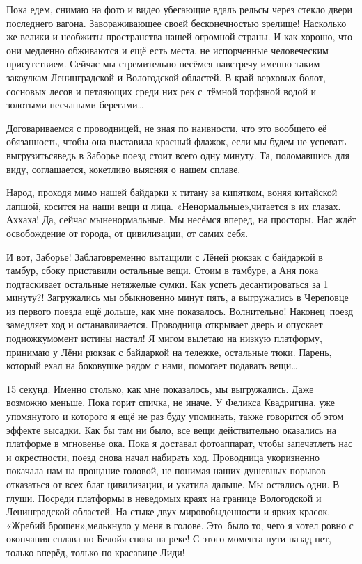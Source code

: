 Пока едем, снимаю на фото и видео убегающие вдаль рельсы через стекло двери последнего вагона. Завораживающее своей бесконечностью зрелище! Насколько же велики и необжиты пространства нашей огромной страны. И как хорошо, что они медленно обживаются и ещё есть места, не испорченные человеческим присутствием. Сейчас мы стремительно несёмся навстречу именно таким закоулкам Ленинградской и Вологодской областей. В край верховых болот, сосновых лесов и петляющих среди них рек с~тёмной торфяной водой и золотыми песчаными берегами\ldots~

Договариваемся с проводницей, не зная по наивности, что это вообще\sdash то её обязанность, чтобы она выставила красный флажок, если мы будем не успевать выгрузиться\mdash ведь в Заборье поезд стоит всего одну минуту. Та, поломавшись для виду, соглашается, кокетливо выясняя о нашем сплаве. 

Народ, проходя мимо нашей байдарки к титану за кипятком, воняя китайской лапшой, косится на наши вещи и лица.  «Ненормальные»,\mdash читается в их глазах. Ах\sdash ха\sdash ха! Да, сейчас мы\mdash ненормальные. Мы несёмся вперед, на просторы. Нас ждёт освобождение от города, от цивилизации, от самих себя.

И вот, Заборье! Заблаговременно вытащили с Лёней рюкзак с байдаркой в тамбур, сбоку приставили остальные вещи. Стоим в тамбуре, а Аня пока подтаскивает остальные нетяжелые сумки. Как успеть десантироваться за 1 минуту?! Загружались мы обыкновенно минут пять, а выгружались в Череповце из первого поезда ещё дольше, как мне показалось. Волнительно! Наконец~поезд замедляет ход и останавливается. Проводница открывает дверь и опускает подножку\mdash момент истины настал! Я мигом вылетаю на низкую платформу, принимаю у Лёни рюкзак с байдаркой на тележке, остальные тюки. Парень, который ехал на боковушке рядом с нами, помогает подавать вещи\ldots~

15 секунд. Именно столько, как мне показалось, мы выгружались. Даже возможно меньше. Пока горит спичка, не иначе. У Феликса Квадригина, уже упомянутого и которого я ещё не раз буду упоминать, также говорится об этом эффекте высадки. Как бы там ни было, все вещи действительно оказались на платформе в мгновенье ока. Пока я доставал фотоаппарат, чтобы запечатлеть нас и окрестности, поезд снова начал набирать ход. Проводница укоризненно покачала нам на прощание головой, не понимая наших душевных порывов отказаться от всех благ цивилизации, и укатила дальше. Мы остались одни. В глуши. Посреди платформы в неведомых краях на границе Вологодской и Ленинградской областей. На стыке двух миров\mdash обыденности и ярких красок. «Жребий брошен»,\mdash мелькнуло у меня в голове. Это~было то, чего я хотел ровно с окончания сплава по Белой\mdash я снова на реке! С этого момента пути назад нет, только вперёд, только по красавице Лиди!

